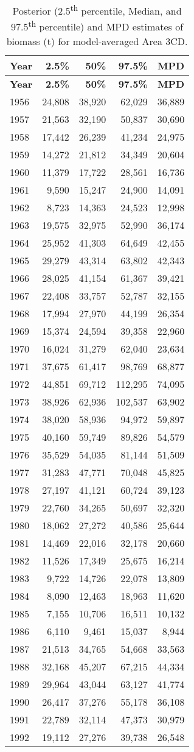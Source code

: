 \documentclass[11pt]{book}
\begin{document}
\begin{longtable}[]{@{}lrrrr@{}}
\caption{\label{tab:tab-post-biomass-avg-3cd}Posterior (2.5\textsuperscript{th} percentile, Median, and 97.5\textsuperscript{th} percentile) and MPD estimates of biomass (t) for model-averaged Area 3CD.}\tabularnewline
\toprule
\textbf{Year} & \textbf{2.5\%} & \textbf{50\%} & \textbf{97.5\%} & \textbf{MPD}\tabularnewline
\midrule
\endfirsthead
\toprule
\textbf{Year} & \textbf{2.5\%} & \textbf{50\%} & \textbf{97.5\%} & \textbf{MPD}\tabularnewline
\midrule
\endhead
1956 & 24,808 & 38,920 & 62,029 & 36,889\tabularnewline
1957 & 21,563 & 32,190 & 50,837 & 30,690\tabularnewline
1958 & 17,442 & 26,239 & 41,234 & 24,975\tabularnewline
1959 & 14,272 & 21,812 & 34,349 & 20,604\tabularnewline
1960 & 11,379 & 17,722 & 28,561 & 16,736\tabularnewline
1961 & 9,590 & 15,247 & 24,900 & 14,091\tabularnewline
1962 & 8,723 & 14,363 & 24,523 & 12,998\tabularnewline
1963 & 19,575 & 32,975 & 52,990 & 36,174\tabularnewline
1964 & 25,952 & 41,303 & 64,649 & 42,455\tabularnewline
1965 & 29,279 & 43,314 & 63,802 & 42,343\tabularnewline
1966 & 28,025 & 41,154 & 61,367 & 39,421\tabularnewline
1967 & 22,408 & 33,757 & 52,787 & 32,155\tabularnewline
1968 & 17,994 & 27,970 & 44,199 & 26,354\tabularnewline
1969 & 15,374 & 24,594 & 39,358 & 22,960\tabularnewline
1970 & 16,024 & 31,279 & 62,040 & 23,634\tabularnewline
1971 & 37,675 & 61,417 & 98,769 & 68,877\tabularnewline
1972 & 44,851 & 69,712 & 112,295 & 74,095\tabularnewline
1973 & 38,926 & 62,936 & 102,537 & 63,902\tabularnewline
1974 & 38,020 & 58,936 & 94,972 & 59,897\tabularnewline
1975 & 40,160 & 59,749 & 89,826 & 54,579\tabularnewline
1976 & 35,529 & 54,035 & 81,144 & 51,509\tabularnewline
1977 & 31,283 & 47,771 & 70,048 & 45,825\tabularnewline
1978 & 27,197 & 41,121 & 60,724 & 39,123\tabularnewline
1979 & 22,760 & 34,265 & 50,697 & 32,320\tabularnewline
1980 & 18,062 & 27,272 & 40,586 & 25,644\tabularnewline
1981 & 14,469 & 22,016 & 32,178 & 20,660\tabularnewline
1982 & 11,526 & 17,349 & 25,675 & 16,214\tabularnewline
1983 & 9,722 & 14,726 & 22,078 & 13,809\tabularnewline
1984 & 8,090 & 12,463 & 18,963 & 11,620\tabularnewline
1985 & 7,155 & 10,706 & 16,511 & 10,132\tabularnewline
1986 & 6,110 & 9,461 & 15,037 & 8,944\tabularnewline
1987 & 21,513 & 34,765 & 54,668 & 33,563\tabularnewline
1988 & 32,168 & 45,207 & 67,215 & 44,334\tabularnewline
1989 & 29,964 & 43,044 & 63,127 & 41,774\tabularnewline
1990 & 26,417 & 37,276 & 55,178 & 36,108\tabularnewline
1991 & 22,789 & 32,114 & 47,373 & 30,979\tabularnewline
1992 & 19,112 & 27,276 & 39,738 & 26,548\tabularnewline

\end{longtable}
\end{document}
